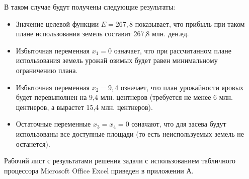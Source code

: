 В таком случае будут получены следующие результаты:
\begin{itemize}
\item Значение целевой функции $ E = 267{,}8 $ показывает, что прибыль при таком
  плане использования земель составит 267{,}8 млн. ден.ед.

\item Избыточная переменная $ x_{1} = 0 $ означает, что при рассчитанном плане использования
  земель урожай озимых будет равен минимальному ограничению плана.

\item Избыточная переменная $ x_{2} = 9{,}4 $ означает, что план урожайности яровых 
  будет перевыполнен на 9{,}4 млн. центнеров (требуется не менее 6 млн. центнеров, а
  вырастет 15{,}4 млн. центнеров).

\item Остаточные переменные $ x_{3} = x_{4} = 0 $ означают, что для засева будут
  использованы все доступные площади (то есть неиспользуемых земель не останется).
\end{itemize}

Рабочий лист с результатами решения задачи с использованием
табличного процессора Microsoft Office Excel приведен в приложении А.

\pagebreak